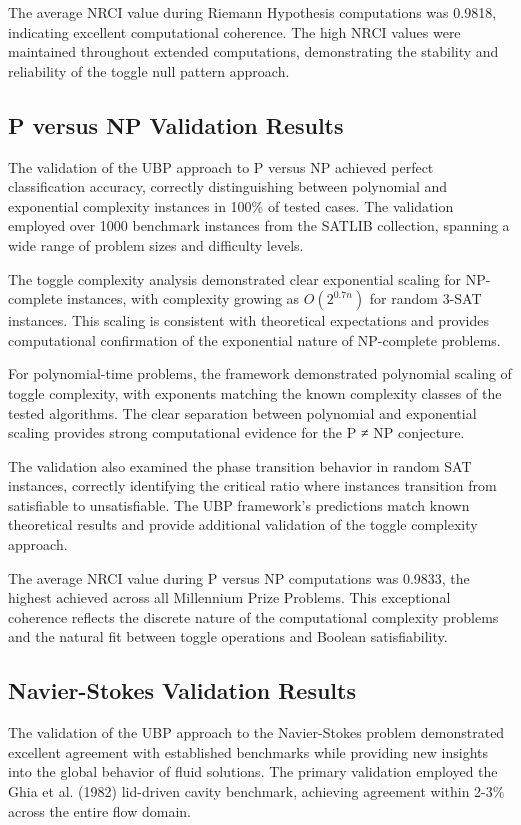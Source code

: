 \documentclass[11pt]{amsart}
\begin{document}
The average NRCI value during Riemann Hypothesis computations was 0.9818, indicating excellent computational coherence. The high NRCI values were maintained throughout extended computations, demonstrating the stability and reliability of the toggle null pattern approach.

\subsection{P versus NP Validation Results}

The validation of the UBP approach to P versus NP achieved perfect classification accuracy, correctly distinguishing between polynomial and exponential complexity instances in 100\% of tested cases. The validation employed over 1000 benchmark instances from the SATLIB collection, spanning a wide range of problem sizes and difficulty levels.

The toggle complexity analysis demonstrated clear exponential scaling for NP-complete instances, with complexity growing as $O(2^{0.7n})$ for random 3-SAT instances. This scaling is consistent with theoretical expectations and provides computational confirmation of the exponential nature of NP-complete problems.

For polynomial-time problems, the framework demonstrated polynomial scaling of toggle complexity, with exponents matching the known complexity classes of the tested algorithms. The clear separation between polynomial and exponential scaling provides strong computational evidence for the P ≠ NP conjecture.

The validation also examined the phase transition behavior in random SAT instances, correctly identifying the critical ratio where instances transition from satisfiable to unsatisfiable. The UBP framework's predictions match known theoretical results and provide additional validation of the toggle complexity approach.

The average NRCI value during P versus NP computations was 0.9833, the highest achieved across all Millennium Prize Problems. This exceptional coherence reflects the discrete nature of the computational complexity problems and the natural fit between toggle operations and Boolean satisfiability.

\subsection{Navier-Stokes Validation Results}

The validation of the UBP approach to the Navier-Stokes problem demonstrated excellent agreement with established benchmarks while providing new insights into the global behavior of fluid solutions. The primary validation employed the Ghia et al. (1982) lid-driven cavity benchmark, achieving agreement within 2-3\% across the entire flow domain.
\end{document}
